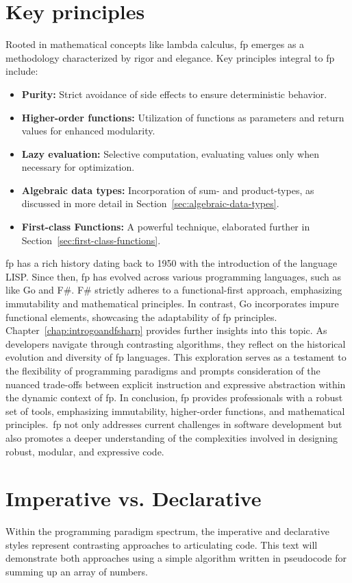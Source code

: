     \section{Key principles}
    Rooted in mathematical concepts like lambda calculus, \ac{fp} emerges as a methodology characterized by rigor and elegance.
    Key principles integral to \ac{fp} include:
    \begin{itemize}
        \item \textbf{Purity:} Strict avoidance of side effects to ensure deterministic behavior.
        \item \textbf{Higher-order functions:} Utilization of functions as parameters and return values for enhanced modularity.
        \item \textbf{Lazy evaluation:} Selective computation, evaluating values only when necessary for optimization.
        \item \textbf{Algebraic data types:} Incorporation of sum- and product-types, as discussed in more detail in Section\ \ref{sec:algebraic-data-types}.
        \item \textbf{First-class Functions:} A powerful technique, elaborated further in Section\ \ref{sec:first-class-functions}.
    \end{itemize}
    \ac{fp} has a rich history dating back to 1950 with the introduction of the language LISP. Since then, \ac{fp} has evolved across various programming languages, such as like Go and F\#. F\# strictly adheres to a functional-first approach, emphasizing immutability and mathematical principles. In contrast, Go incorporates impure functional elements, showcasing the adaptability of \ac{fp} principles. Chapter\ \ref{chap:introgoandfsharp} provides further insights into this topic. As developers navigate through contrasting algorithms, they reflect on the historical evolution and diversity of \ac{fp} languages. This exploration serves as a testament to the flexibility of programming paradigms and prompts consideration of the nuanced trade-offs between explicit instruction and expressive abstraction within the dynamic context of \ac{fp}. In conclusion, \ac{fp} provides professionals with a robust set of tools, emphasizing immutability, higher-order functions, and mathematical principles.\ \ac{fp} not only addresses current challenges in software development but also promotes a deeper understanding of the complexities involved in designing robust, modular, and expressive code.

    \section{Imperative vs. Declarative}
    Within the programming paradigm spectrum, the imperative and declarative styles represent contrasting approaches to articulating code. This text will demonstrate both approaches using a simple algorithm written in pseudocode for summing up an array of numbers.

